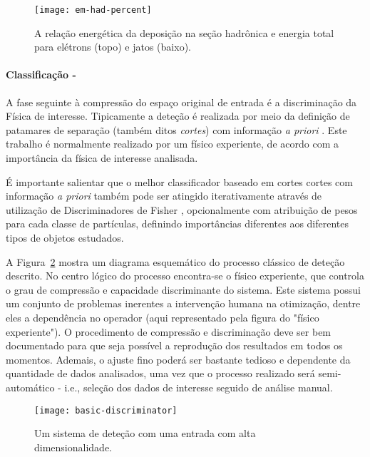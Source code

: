 \begin{figure}
\begin{center}
\texttt{[image: em-had-percent]}
\end{center}
\caption{A relação energética da deposição na seção hadrônica e energia total para
elétrons (topo) e jatos (baixo).}
\label{fig:e-jet-deposit}
\end{figure}

\paragraph{Classificação -} A fase seguinte à compressão do espaço original
de entrada é a discriminação da Física de interesse. Tipicamente
\cite{hlt-tdr, zeus-neural} a deteção é realizada por meio da definição de
patamares de separação (também ditos \emph{cortes}) com informação \emph{a
priori} \cite{vantrees}. Este trabalho é normalmente realizado por um físico
experiente, de acordo com a importância da física de interesse analisada. 

É importante salientar que o melhor classificador baseado em cortes cortes com
informação \emph{a priori} também pode ser atingido iterativamente através de
utilização de Discriminadores de Fisher \cite{haykin-adaptative},
opcionalmente com atribuição de pesos para cada classe de partículas,
definindo importâncias diferentes aos diferentes tipos de objetos estudados.

A Figura~\ref{fig:basic-discriminator} mostra um diagrama esquemático do
processo clássico de deteção descrito. No centro lógico do processo
encontra-se o físico experiente, que controla o grau de compressão e
capacidade discriminante do sistema. Este sistema possui um conjunto de
problemas inerentes a intervenção humana na otimização, dentre eles a
dependência no operador (aqui representado pela figura do "físico
experiente"). O procedimento de compressão e discriminação deve ser bem
documentado para que seja possível a reprodução dos resultados em todos os
momentos. Ademais, o ajuste fino poderá ser bastante tedioso e dependente da
quantidade de dados analisados, uma vez que o processo realizado será
semi-automático - i.e., seleção dos dados de interesse seguido de análise
manual.

\begin{figure}
\begin{center}
\texttt{[image: basic-discriminator]}
\end{center}
\caption{Um sistema  de deteção com uma entrada com alta
dimensionalidade.}
\label{fig:basic-discriminator}
\end{figure}

